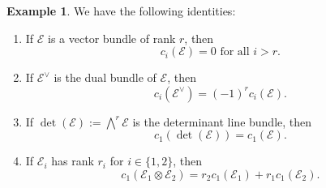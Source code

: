 \documentclass[12pt,a4paper]{amsart}
\theoremstyle{plain}
\theoremstyle{definition}
\newtheorem{exmp}[thm]{Example}
\theoremstyle{remark}
\begin{document}
\begin{exmp}
  We have the following identities:
  \begin{enumerate}
    \item If $\mathscr{E}$ is a vector bundle of rank $r$, then
      \[ c_{i}(\mathscr{E}) = 0 \text{ for all } i > r. \]
    \item If $\mathscr{E}^{\vee}$ is the dual bundle of $\mathscr{E}$, then
      \[ c_{i}(\mathscr{E}^{\vee}) = (-1)^{r}c_{i}(\mathscr{E}). \]
    \item If $\det(\mathscr{E}) := \bigwedge^{r}\mathscr{E}$ is the determinant line bundle, then
      \[ c_{1}(\det(\mathscr{E})) = c_{1}(\mathscr{E}). \]
    \item If $\mathscr{E}_{i}$ has rank $r_{i}$ for $i \in \{1,2\}$, then
      \[ c_{1}(\mathscr{E}_{1} \otimes \mathscr{E}_{2}) = r_{2}c_{1}(\mathscr{E}_{1}) + r_{1}c_{1}(\mathscr{E}_{2}). \]
  \end{enumerate}
\end{exmp}



\vfill
\end{document}
